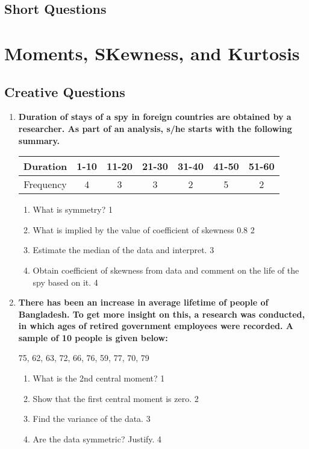 \documentclass[a4paper,oneside]{book}
\begin{document}
\section{Short Questions}

\chapter{Moments, SKewness, and Kurtosis} 
\section{Creative Questions}

  \begin{enumerate}

   \item
	  \textbf{Duration of stays of a spy in foreign countries are obtained by a researcher. As part of an analysis, s/he starts with the following summary.} 
	  
	  \begin{table}[h]
	  \centering
\begin{tabular}{c|cccccc}
Duration & 1-10 & 11-20 & 21-30 & 31-40 & 41-50 & 51-60 \\ \hline
Frequency & 4 & 3 & 3 & 2 & 5 & 2
\end{tabular}
\end{table}
  
  \begin{enumerate}
    \item
	What is symmetry? \hfill 1
    \item
	What is implied by the value of coefficient of skewness 0.8 \hfill 2
    \item  
	Estimate the median of the data and interpret. \hfill 3
    \item
	Obtain coefficient of skewness from data and comment on the life of the spy based on it. \hfill 4
  \end{enumerate}


   \item
	  \textbf{There has been an increase in average lifetime of people of Bangladesh. To get more insight on this, a research was conducted, in which ages of retired government employees were recorded. A sample of 10 people is given below:}
	  
	  \begin{center}
	  75, 62, 63, 72, 66, 76, 59, 77, 70, 79
	  \end{center}
    \begin{enumerate}
    \item
	What is the 2nd central moment? \hfill 1
    \item
	Show that the first central moment is zero. \hfill 2
    \item  
	Find the variance of the data. \hfill 3
    \item
	Are the data symmetric? Justify. \hfill 4
  \end{enumerate}
  

\end{enumerate}
\end{document}
